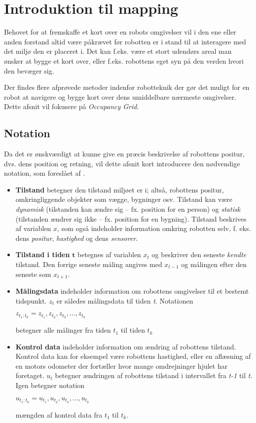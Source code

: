 \section{Introduktion til mapping}
Behovet for at fremskaffe et kort over en robots omgivelser vil i den ene eller anden forstand altid være påkrævet før robotten er i stand til at interagere med det miljø den er placeret i.
Det kan f.eks. være et stort udendørs areal man ønsker at bygge et kort over, eller f.eks. robottens eget syn på den verden hvori den bevæger sig.

Der findes flere afprøvede metoder indenfor robotteknik der gør det muligt for en robot at navigere og bygge kort over dens umiddelbare nærmeste omgivelser.
Dette afsnit vil fokusere på \textit{Occupancy Grid}.

\subsection{Notation}
Da det er ønskværdigt at kunne give en præcis beskrivelse af robottens positur, dvs. dens position og retning, vil dette afsnit kort introducere den nødvendige notation, som foreslået af \citet[s.~16-21]{probabilisticRobotics}.

\begin{itemize}
\item \textbf{Tilstand} betegner den tilstand miljøet er i; altså, robottens positur, omkringliggende objekter som vægge, bygninger osv. 
Tilstand kan være \textit{dynamisk} (tilstanden kan ændre sig -- fx. position for en person) og \textit{statisk} (tilstanden ændrer sig ikke -- fx. position for en bygning).
Tilstand beskrives af variablen $x$, som også indeholder information omkring robotten selv, f. eks. dens \textit{positur}, \textit{hastighed} og dens \textit{sensorer}.

\item \textbf{Tilstand i tiden} $\mathbf{t}$ betegnes af variablen $x_t$ og beskriver den seneste \textit{kendte} tilstand. 
Den forrige seneste måling angives med $x_{t-1}$ og målingen efter den seneste som $x_{t+1}$.

\item \textbf{Målingsdata} indeholder information om robottens omgivelser til et bestemt tidspunkt. 
$z_t$ er således målingsdata til tiden \textit{t}. 
Notationen

$z_{t_1:t_k} = z_{t_1}, z_{t_2}, z_{t_3}, \dots , z_{t_k}$

betegner alle målinger fra tiden \textit{$ t_1 $} til tiden \textit{$ t_k $}
\item \textbf{Kontrol data} indeholder information om ændring af robottens tilstand. 
Kontrol data kan for eksempel være robottens hastighed, eller en aflæsning af en motors odometer der fortæller hvor mange omdrejninger hjulet har foretaget.
$u_t$ betegner ændringen af robottens tilstand i intervallet fra \textit{t-1} til \textit{t}.
Igen betegner notation

$u_{t_1:t_k} = u_{t_1}, u_{t_2}, u_{t_3}, \dots , u_{t_k}$

mængden af kontrol data fra \textit{$ t_1 $} til \textit{$ t_k $}.
\end{itemize}


